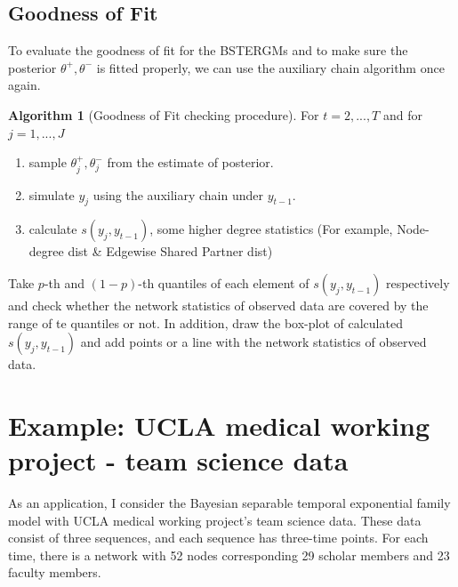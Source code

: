 \documentclass[a4paper, 11pt]{report}
\theoremstyle{definition}
\newtheorem{algo}{Algorithm}[section]
\begin{document}
\section{Goodness of Fit}
To evaluate the goodness of fit for the BSTERGMs and to make sure the posterior $\theta^+,\theta^-$ is fitted properly,
we can use the auxiliary chain algorithm once again.
\begin{algo}[Goodness of Fit checking procedure]
    For $t=2,...,T$ and for $j=1,...,J$
    \begin{enumerate}
        \item sample $\theta_j^+,\theta_j^-$ from the estimate of posterior.
        \item simulate $y_j$ using the auxiliary chain under $y_{t-1}$.
        \item calculate $s(y_j, y_{t-1})$, some higher degree statistics (For example, Node-degree dist \& Edgewise Shared Partner dist)
    \end{enumerate}
    Take $p$-th and $(1-p)$-th quantiles of each element of $s(y_j, y_{t-1})$ respectively and check 
    whether the network statistics of observed data are covered by the range of te quantiles or not.
    In addition, draw the box-plot of calculated $s(y_j, y_{t-1})$ and add points or a line with the network statistics of observed data.
\end{algo}




\chapter{Example: UCLA medical working project - team science data} \label{Chapter6}
As an application, I consider the Bayesian separable temporal exponential family model 
with UCLA medical working project's team science data.
These data consist of three sequences, and each sequence has three-time points.
For each time, there is a network with 52 nodes corresponding 29 scholar members and 23 faculty members.
\end{document}
